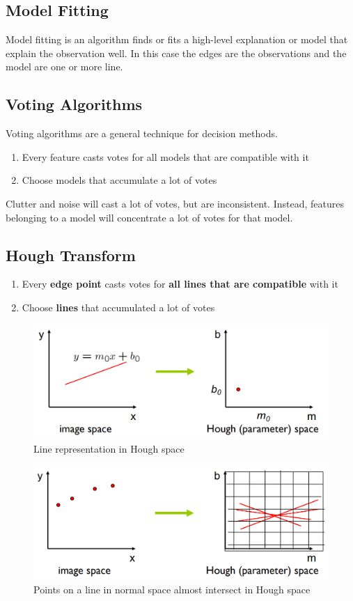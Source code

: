 \documentclass[11pt]{article}
\theoremstyle{definition}
\begin{document}
\subsection{Model Fitting}
Model fitting is an algorithm finds or fits a high-level explanation or model that explain the observation well. In this case the edges are the observations and the model are one or more line.

\subsection{Voting Algorithms}
Voting algorithms are a general technique for decision methods.

\begin{enumerate}
	\item Every feature casts votes for all models that are compatible with it
	\item Choose models that accumulate a lot of votes
\end{enumerate}

Clutter and noise will cast a lot of votes, but are inconsistent. Instead, features belonging to a model will concentrate a lot of votes for that model.

\subsection{Hough Transform}
\begin{enumerate}
	\item Every \textbf{edge point} casts votes for \textbf{all lines that are compatible} with it
	\item Choose \textbf{lines} that accumulated a lot of votes
\end{enumerate}

\begin{figure}[H]
	\centering
	\includegraphics[width=0.8\linewidth,keepaspectratio]{img/line_representation_hough}
	\caption{Line representation in Hough space}
\end{figure}

\begin{figure}[H]
	\centering
	\includegraphics[width=0.8\linewidth]{img/points_representation_hough}
	\caption{Points on a line in normal space almost intersect in Hough space}
	\label{fig:pointsrepresentationhough}
\end{figure}
\end{document}
